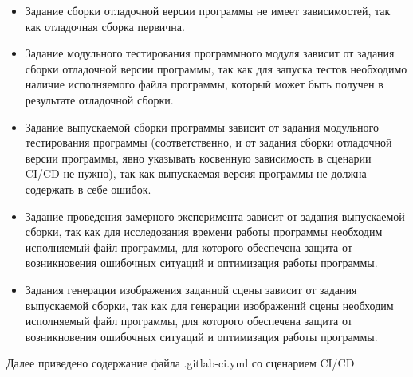 \documentclass[a4paper,14pt]{extreport}
\begin{document}
\begin{itemize}
\item Задание сборки отладочной версии программы не имеет 
зависимостей, так как отладочная сборка первична.
\item Задание модульного тестирования программного модуля зависит от 
задания сборки отладочной версии программы, так как для запуска 
тестов необходимо наличие исполняемого файла программы, 
который может быть получен в результате отладочной сборки.
\item Задание выпускаемой сборки программы зависит от задания 
модульного тестирования программы (соответственно, и от задания 
сборки отладочной версии программы, явно указывать косвенную 
зависимость в сценарии CI/CD не нужно), так как выпускаемая 
версия программы не должна содержать в себе ошибок.
\item Задание проведения замерного эксперимента зависит от задания 
выпускаемой сборки, так как для исследования времени работы 
программы необходим исполняемый файл программы, для которого 
обеспечена защита от возникновения ошибочных ситуаций и 
оптимизация работы программы.
\item Задания генерации изображения заданной сцены зависит от задания 
выпускаемой сборки, так как для генерации изображений сцены необходим исполняемый файл программы, для которого обеспечена 
защита от возникновения ошибочных ситуаций и оптимизация 
работы программы.
\end{itemize}
\par Далее приведено содержание файла .gitlab-ci.yml со сценарием CI/CD
\end{document}
